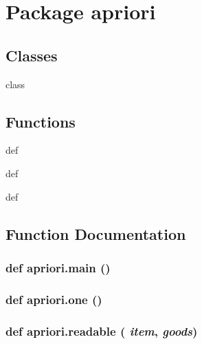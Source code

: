 \section{Package apriori}
\label{namespaceapriori}


\subsection*{Classes}
\begin{CompactItemize}
\item 
class {\bfApriori}
\end{CompactItemize}
\subsection*{Functions}
\begin{CompactItemize}
\item 
def {\bfone}
\item 
def {\bfmain}
\item 
def {\bfreadable}
\end{CompactItemize}


\subsection{Function Documentation}
\subsubsection{\setlength{\rightskip}{0pt plus 5cm}def apriori.main ()}\label{namespaceapriori_739293f7a302f2c151b8a30ce38b071b}


\subsubsection{\setlength{\rightskip}{0pt plus 5cm}def apriori.one ()}\label{namespaceapriori_478de6df033161673aebd800bf7194d5}


\subsubsection{\setlength{\rightskip}{0pt plus 5cm}def apriori.readable ( {\em item},  {\em goods})}\label{namespaceapriori_cc6c8f4c60e7c2c94b5c93a77d28ab56}


